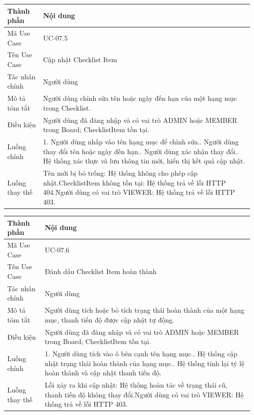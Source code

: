 \vspace{0.5cm}
\noindent\begin{tabular}{|p{3.5cm}|p{10.5cm}|}
\hline
\textbf{Thành phần} & \textbf{Nội dung} \\
\hline
Mã Use Case & UC-07.5 \\
\hline
Tên Use Case & Cập nhật Checklist Item \\
\hline
Tác nhân chính & Người dùng \\
\hline
Mô tả tóm tắt & Người dùng chỉnh sửa tên hoặc ngày đến hạn của một hạng mục trong Checklist. \\
\hline
Điều kiện & Người dùng đã đăng nhập và có vai trò ADMIN hoặc MEMBER trong Board; ChecklistItem tồn tại. \\
\hline
Luồng chính & 1. Người dùng nhấp vào tên hạng mục để chỉnh sửa.\newline 2. Người dùng thay đổi tên hoặc ngày đến hạn.\newline 3. Người dùng xác nhận thay đổi.\newline 4. Hệ thống xác thực và lưu thông tin mới, hiển thị kết quả cập nhật. \\
\hline
Luồng thay thế & Tên mới bị bỏ trống: Hệ thống không cho phép cập nhật.\newline ChecklistItem không tồn tại: Hệ thống trả về lỗi HTTP 404.\newline Người dùng có vai trò VIEWER: Hệ thống trả về lỗi HTTP 403. \\
\hline
\end{tabular}

\vspace{0.5cm}
\noindent\begin{tabular}{|p{3.5cm}|p{10.5cm}|}
\hline
\textbf{Thành phần} & \textbf{Nội dung} \\
\hline
Mã Use Case & UC-07.6 \\
\hline
Tên Use Case & Đánh dấu Checklist Item hoàn thành \\
\hline
Tác nhân chính & Người dùng \\
\hline
Mô tả tóm tắt & Người dùng tích hoặc bỏ tích trạng thái hoàn thành của một hạng mục, thanh tiến độ được cập nhật tự động. \\
\hline
Điều kiện & Người dùng đã đăng nhập và có vai trò ADMIN hoặc MEMBER trong Board; ChecklistItem tồn tại. \\
\hline
Luồng chính & 1. Người dùng tích vào ô bên cạnh tên hạng mục.\newline 2. Hệ thống cập nhật trạng thái hoàn thành của hạng mục.\newline 3. Hệ thống tính lại tỷ lệ hoàn thành và cập nhật thanh tiến độ. \\
\hline
Luồng thay thế & Lỗi xảy ra khi cập nhật: Hệ thống hoàn tác về trạng thái cũ, thanh tiến độ không thay đổi.\newline Người dùng có vai trò VIEWER: Hệ thống trả về lỗi HTTP 403. \\
\hline
\end{tabular}

